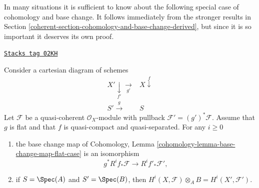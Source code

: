 In many situations it is sufficient to know about the following
special case of cohomology and base change. It follows immediately
from the stronger results in
Section \ref{coherent-section-cohomology-and-base-change-derived},
but since it is so important it deserves its own proof.

\begin{lemma}

\label{coherent-lemma-flat-base-change-cohomology}
\href{https://stacks.math.columbia.edu/tag/02KH}{\texttt{Stacks tag 02KH}}

Consider a cartesian diagram of schemes
$$
\begin{array}{cc}X' \underset{f'}{\downarrow}\underset{g'}{\longrightarrow} & X \overset{f}{\downarrow} \\ S' \overset{g}{\longrightarrow} & S\end{array}
$$
Let $\mathcal{F}$ be a quasi-coherent $\mathcal{O}_X$-module
with pullback $\mathcal{F}' = (g')^*\mathcal{F}$.
Assume that $g$ is flat and that $f$ is quasi-compact and quasi-separated.
For any $i \geq 0$
\begin{enumerate}
\item the base change map of
Cohomology, Lemma \ref{cohomology-lemma-base-change-map-flat-case}
is an isomorphism
$$
g^*R^if_*\mathcal{F} \longrightarrow R^if'_*\mathcal{F}',
$$
\item if $S = \Spec(A)$ and $S' = \Spec(B)$, then
$H^i(X, \mathcal{F}) \otimes_A B = H^i(X', \mathcal{F}')$.
\end{enumerate}
\end{lemma}

